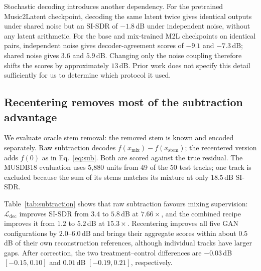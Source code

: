 \documentclass[conference]{IEEEtran}
\newcommand{\tabref}[1]{Table~\ref{#1}}
\newcommand{\Ldec}{\mathcal{L}_\mathrm{dec}}
\begin{document}
Stochastic decoding introduces another dependency. For the pretrained
Music2Latent checkpoint, decoding the same latent twice gives identical outputs under shared
noise but an SI-SDR of $-1.8$\,dB under independent noise, without any latent
arithmetic. For the base and mix-trained M2L checkpoints on identical pairs,
independent noise gives decoder-agreement scores of $-9.1$ and
$-7.3$\,dB; shared noise gives $3.6$ and $5.9$\,dB. Changing only the noise
coupling therefore shifts the scores by approximately $13$\,dB. Prior work
\cite{torres2026linearity} does not specify this detail sufficiently for us
to determine which protocol it used.

\subsection{Recentering removes most of the subtraction advantage}\label{sec:origin}
We evaluate oracle stem removal: the removed stem is known and encoded
separately. Raw subtraction decodes
$f(x_\mathrm{mix})-f(x_\mathrm{stem})$; the recentered version adds $f(0)$
as in Eq.~\ref{eq:sub}. Both are scored against the true residual. The
MUSDB18 evaluation uses 5{,}880 units from 49 of the 50 test tracks; one track
is excluded because the sum of its stems matches its mixture at only
$18.5$\,dB SI-SDR.

\begin{table}[tb]
  \centering\small
  \setlength{\tabcolsep}{2.2pt}
  
  \caption{Oracle stem subtraction on MUSDB18 (SI-SDR, dB; 5{,}880 units,
  49 tracks). M2L denotes Music2Latent. ``$+f(0)$'' applies recentering to the same GAN checkpoint.
  ``gap'' is the shortfall from each model's reconstruction SI-SDR for the
  true residual (the linearity tax; lower is better).}
  \label{tab:subtraction}
\end{table}

\tabref{tab:subtraction} shows that raw subtraction favours mixing
supervision: $\Ldec$ improves SI-SDR from
$3.4$ to $5.8$\,dB at $7.66\times$, and the combined recipe improves it
from $1.2$ to $5.2$\,dB at $15.3\times$. Recentering improves all five GAN
configurations by $2.0$--$6.0$\,dB and brings their aggregate scores within
about $0.5$\,dB of their own reconstruction references, although individual
tracks have larger gaps. After correction, the two treatment--control
differences are $-0.03$\,dB $[-0.15,0.10]$ and $0.01$\,dB
$[-0.19,0.21]$, respectively.
\end{document}
